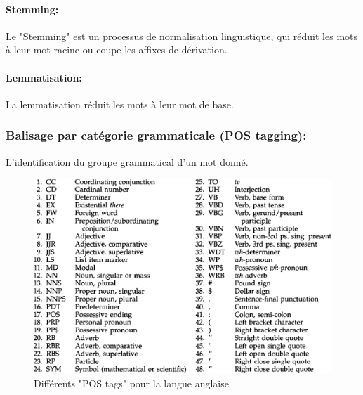 \paragraph{Stemming:}
Le "Stemming" est un processus de normalisation linguistique, qui réduit les mots à leur mot racine ou coupe les affixes de dérivation.
\paragraph{Lemmatisation:}
La lemmatisation réduit les mots à leur mot de base.
\subsubsection{Balisage par catégorie grammaticale (POS tagging):}
L'identification du groupe grammatical d'un mot donné.
\begin{figure}[H]
    \centering
    \includegraphics[width=\textwidth]{realisation/assets/nltk-pos.png}
    \caption{Différents "POS tags" pour la langue anglaise}
    \label{fig:my_label}
\end{figure}
